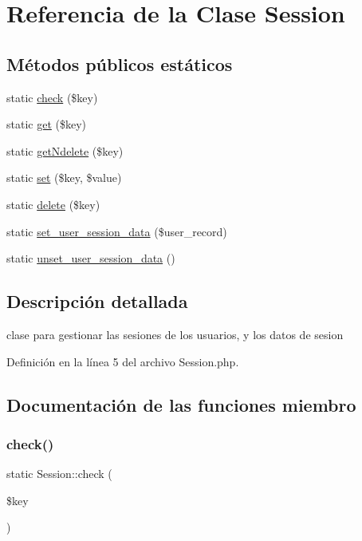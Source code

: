 \hypertarget{class_session}{}\section{Referencia de la Clase Session}
\label{class_session}
\subsection*{Métodos públicos estáticos}
\begin{DoxyCompactItemize}
\item 
static \mbox{\hyperlink{class_session_abbc453dff32fed9748e3873ab9093050}{check}} (\$key)
\item 
static \mbox{\hyperlink{class_session_a555ab9c7731c0103b16baf165e34efe8}{get}} (\$key)
\item 
static \mbox{\hyperlink{class_session_a894fdbe24e887cc604178f0234355440}{get\+Ndelete}} (\$key)
\item 
static \mbox{\hyperlink{class_session_a5c3bf67e192c10d185e759567df6782a}{set}} (\$key, \$value)
\item 
static \mbox{\hyperlink{class_session_a1661dab5f97e1fb80ba16a1098a73649}{delete}} (\$key)
\item 
static \mbox{\hyperlink{class_session_a1e8f0c2d0f7080ea93b738dba952c52f}{set\+\_\+user\+\_\+session\+\_\+data}} (\$user\+\_\+record)
\item 
static \mbox{\hyperlink{class_session_a9dac1e34e7d797173f4a977a83fb9dae}{unset\+\_\+user\+\_\+session\+\_\+data}} ()
\end{DoxyCompactItemize}


\subsection{Descripción detallada}
clase para gestionar las sesiones de los usuarios, y los datos de sesion 

Definición en la línea 5 del archivo Session.\+php.



\subsection{Documentación de las funciones miembro}
\mbox{\label{class_session_abbc453dff32fed9748e3873ab9093050}} 
\subsubsection{\texorpdfstring{check()}{check()}}
{\footnotesize\ttfamily static Session\+::check (\begin{DoxyParamCaption}\item[{}]{\$key }\end{DoxyParamCaption})\hspace{0.3cm}{\ttfamily [static]}}

